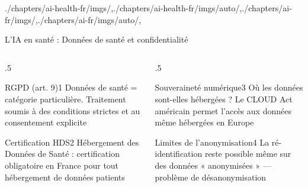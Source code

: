 \begin{graphicspathcontext}{{./chapters/ai-health-fr/imgs/},{./chapters/ai-health-fr/imgs/auto/},{./chapters/ai-fr/imgs/},{./chapters/ai-fr/imgs/auto/},\old}

\begin{frame}[t]{{L'IA en santé :} Données de santé et confidentialité}
	\footnotesize
	\begin{columns}
		\begin{column}{.5\linewidth}
			\vspace{.2cm}
			\begin{rightanchorblock}{RGPD (art. 9)}{1}
				Données de santé = catégorie particulière. Traitement soumis à des conditions strictes et au consentement explicite
			\end{rightanchorblock}
			\begin{rightanchorblock}{Certification HDS}{2}
				Hébergement des Données de Santé : certification obligatoire en France pour tout hébergement de données patients
			\end{rightanchorblock}
		\end{column}
		\begin{column}{.5\linewidth}
			\begin{rightanchorblock}{Souveraineté numérique}{3}
				Où les données sont-elles hébergées ? Le CLOUD Act américain permet l'accès aux données même hébergées en Europe
			\end{rightanchorblock}
			\begin{rightanchorblock}{Limites de l'anonymisation}{4}
				La ré-identification reste possible même sur des données « anonymisées » --- problème de désanonymisation
			\end{rightanchorblock}
		\end{column}
	\end{columns}
	\normalsize
\end{frame}


\end{graphicspathcontext}
